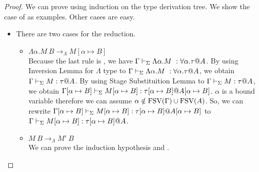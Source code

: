 \begin{proof}
	We can prove using induction on the type derivation tree.
	We show the case of \TIns{}{} as examples.
	Other cases are easy.
	\begin{itemize}
		\newcommand{\R}{\longrightarrow_{\Lambda}}
		\item \TIns
		      		      	      	      	      	      	      	      	      	      		      	      	      	      
		      There are two cases for the reduction.
		      \begin{itemize}
		      	\item $\Lambda\alpha.M\ B \R M[\alpha \mapsto B]$\\
					Because the last rule is \TIns{}, we have $\Gamma \vdash_\Sigma \Lambda\alpha.M\ : \forall\alpha.\tau @ A$.
		      	    By using Inversion Lemma for $\Lambda$ type to $\Gamma \vdash_\Sigma \Lambda\alpha.M\ : \forall\alpha.\tau @ A$,
		      	    we obtain $\Gamma \vdash_\Sigma M : \tau @ A$.
		      	    By using Stage Substituition Lemma to $\Gamma \vdash_\Sigma M : \tau @ A$,
					we obtain $\Gamma[\alpha \mapsto B] \vdash_\Sigma M[\alpha \mapsto B] : \tau[\alpha \mapsto B] @ A[\alpha \mapsto B]$.
					$\alpha$ is a bound variable therefore we can assume $\alpha \notin \text{FSV}(\Gamma) \cup \text{FSV}(A)$.
		      	    So, we can rewrite $\Gamma[\alpha \mapsto B] \vdash_\Sigma M[\alpha \mapsto B] : \tau[\alpha \mapsto B] @ A[\alpha \mapsto B]$ to
		      	    $\Gamma \vdash_\Sigma M[\alpha \mapsto B] : \tau[\alpha \mapsto B] @ A$.
		      	\item $M\ B \R M'\ B$\\
		      	      We can prove the induction hypothesis and \TIns.
		      \end{itemize}
	\end{itemize}
\end{proof}
	
